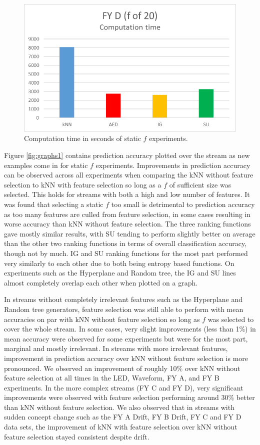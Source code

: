 \begin{figure}[h]
\begin{center}
\includegraphics[scale=0.17]{Graphs/FY_D/time20}
\caption{Computation time in seconds of static $f$ experiments.}
\label{fig:time}
\end{center}
\end{figure}

Figure \ref{fig:graphs1} contains prediction accuracy plotted over the stream as new examples come in for static $f$ experiments. Improvements in prediction accuracy can be observed across all experiments when comparing the kNN without feature selection to kNN with feature selection so long as a $f$ of sufficient size was selected. This holds for streams with both a high and low number of features. It was found that selecting a static $f$ too small is detrimental to prediction accuracy as too many features are culled from feature selection, in some cases resulting in worse accuracy than kNN without feature selection. The three ranking functions gave mostly similar results, with SU tending to perform slightly better on average than the other two ranking functions in terms of overall classification accuracy, though not by much. IG and SU ranking functions for the most part performed very similarly to each other due to both being entropy based functions. On experiments such as the Hyperplane and Random tree, the IG and SU lines almost completely overlap each other when plotted on a graph.

In streams without completely irrelevant features such as the Hyperplane and Random tree generators, feature selection was still able to perform with mean accuracies on par with kNN without feature selection so long as $f$ was selected to cover the whole stream. In some cases, very slight improvements (less than 1\%) in mean accuracy were observed for some experiments but were for the most part, marginal and mostly irrelevant. In streams with more irrelevant features, improvement in prediction accuracy over kNN without feature selection is more pronounced. We observed an improvement of roughly 10\% over kNN without feature selection at all times in the LED, Waveform, FY A, and FY B experiments. In the more complex streams (FY C and FY D), very significant improvements were observed with feature selection performing around 30\% better than kNN without feature selection. We also observed that in streams with sudden concept change such as the FY A Drift, FY B Drift, FY C and FY D data sets, the improvement of kNN with feature selection over kNN without feature selection stayed consistent despite drift.

